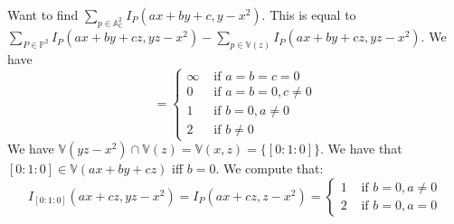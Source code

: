 \documentclass{report}
\begin{document}
\begin{examples}
    Want to find $\sum_{ p \in \mathbb{A}^{2}_{\mathbb{C}}} I_{P}(ax + by + c, y - x^{2})$. This is equal to $\sum_{ P \in \mathbb{ P}^{2}} I_{P}(ax + by + cz , yz - x^{2}) - \sum_{ p \in \mathbb{V}(z)}I_{P}(ax + by + cz, yz - x^{2})$. We have
        \begin{equation*}
            =\begin{cases}
                \infty &\text{ if }  a = b = c = 0 \\
                0 &\text{ if } a = b = 0, c \neq 0 \\
                1 &\text{ if } b = 0, a \neq 0 \\
                2 &\text{ if } b \neq 0   
            \end{cases}
        \end{equation*}
    We have $\mathbb{V}(yz - x^{2}) \cap \mathbb{ V}(z) = \mathbb{V}(x, z) = \{[0 : 1 : 0]\}$. We have that $[0 : 1 : 0] \in \mathbb{ V}(ax + by + cz)$ iff $b = 0$. We compute that:
        \begin{equation*}
            I_{[0 : 1 : 0]}(ax + cz, yz - x^{2}) = I_{P}(ax + cz, z - x^{2}) = \begin{cases}
                1            &\text{ if } b = 0, a \neq 0 \\
                2 &\text{ if } b = 0, a = 0   
            \end{cases}
        \end{equation*}
\end{examples}
\end{document}

